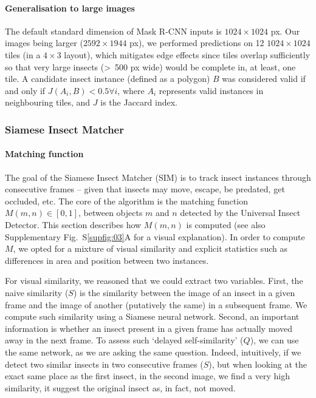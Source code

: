 \documentclass[12pt]{article}
\begin{document}
\begin{linenumbers}
		\paragraph{Generalisation to large images}
		The default standard dimension of Mask R-CNN inputs is $1024 \times{} 1024$ px. 
		Our images being larger ($2592 \times{} 1944$ px), we performed predictions on 12 $1024 \times{}1024$ tiles (in a $4 \times{} 3$ layout), which mitigates edge effects since tiles overlap sufficiently so that very large insects (>~500 px wide) would be complete in, at least, one tile. A candidate insect instance (defined as a polygon) $B$ was considered valid if and only if $J(A_{i}, B) < 0.5 \forall i$, where $A_i$ represents valid instances in neighbouring tiles, and $J$ is the Jaccard index.

		\subsubsection*{Siamese Insect Matcher}
		\paragraph{Matching function}
		The goal of the Siamese Insect Matcher (SIM) is to track insect instances through consecutive frames – given that insects may move, escape, be predated, get occluded, etc. The core of the algorithm is the matching function $M(m,n) \in [0, 1]$, between objects $m$ and $n$ detected by the Universal Insect Detector. 		
		This section describes how $M(m,n)$ is computed (see also Supplementary Fig.~S\ref{supfig:03}A for a visual explanation).
		In order to compute $M$, we opted for a mixture of visual similarity and explicit statistics such as differences in area and position between two instances.

		For visual similarity, we reasoned that we could extract two variables. First, the naive similarity ($S$) is the similarity between the image of an insect in a given frame and the image of another (putatively the same) in a subsequent frame. We compute such similarity using a Siamese neural network. Second, an important information is whether an insect present in a given frame has actually moved away in the next frame. To assess such `delayed self-similarity' ($Q$), we can use the same network, as we are asking the same question.
		Indeed, intuitively, if we detect two similar insects in two consecutive frames ($S$), but when looking at the exact same place as the first insect, in the second image, we find a very high similarity, it suggest the original insect as, in fact, not moved. 


\end{linenumbers}
\end{document}
